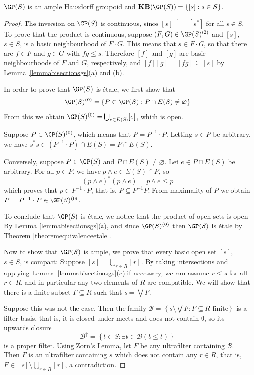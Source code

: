 \begin{proposition}[{\cite[Lemma 2.21(12)]{MR2827424}}]\label{propositionxisisanisomorphism}
$\GP(S)$ is an ample Hausdorff groupoid and $\mathbf{KB}(\GP(S))=\left\{[s]:s\in S\right\}$.
\end{proposition}
\begin{proof}
The inversion on $\GP(S)$ is continuous, since $[s]^{-1}=[s^*]$ for all $s\in S$. To prove that the product is continuous, suppose $(F,G)\in\GP(S)^{(2)}$ and $[s]$, $s\in S$, is a basic neighbourhood of $F\cdot G$. This means that $s\in F\cdot G$, so that there are $f\in F$ and $g\in G$ with $fg\leq s$. Therefore $[f]$ and $[g]$ are basic neighbourhoods of $F$ and $G$, respectively, and $[f][g]=[fg]\subseteq[s]$ by Lemma~\ref{lemmabisectionsgs}(a) and (b).

In order to prove that $\GP(S)$ is étale, we first show that
\[\GP(S)^{(0)}=\left\{P\in\GP(S):P\cap E(S)\neq\varnothing\right\}\]
From this we obtain $\GP(S)^{(0)}=\bigcup_{e\in E(S)}[e]$, which is open.

Suppose $P\in\GP(S)^{(0)}$, which means that $P=P^{-1}\cdot P$. Letting $s\in P$ be arbitrary, we have $s^*s\in(P^{-1}\cdot P)\cap E(S)=P\cap E(S)$.

Conversely, suppose $P\in\GP(S)$ and $P\cap E(S)\neq\varnothing$. Let $e\in P\cap E(S)$ be arbitrary. For all $p\in P$, we have $p\land e\in E(S)\cap P$, so
\[(p\land e)^*(p\land e)=p\land e\leq p\]
which proves that $p\in P^{-1}\cdot P$, that is, $P\subseteq P^{-1}P$. From maximality of $P$ we obtain $P=P^{-1}\cdot P\in\GP(S)^{(0)}$.

To conclude that $\GP(S)$ is étale, we notice that the product of open sets is open By Lemma \ref{lemmabisectionsgs}(a), and since $\GP(S)^{(0)}$ then $\GP(S)$ is étale by Theorem \ref{theoremequivalenceetale}.

Now to show that $\GP(S)$ is ample, we prove that every basic open set $[s]$, $s\in S$, is compact: Suppose $[s]=\bigcup_{r\in R}[r]$. By taking intersections and applying Lemma~\ref{lemmabisectionsgs}(c) if necessary, we can assume $r\leq s$ for all $r\in R$, and in particular any two elements of $R$ are compatible. We will show that there is a finite subset $F\subseteq R$ such that $s=\bigvee F$.

Suppose this was not the case. Then the family $\mathcal{B}=\left\{s\setminus\bigvee F:F\subseteq R\text{ finite}\right\}$ is a filter basis, that is, it is closed under meets and does not contain $0$, so its upwards closure
\[\mathcal{B}^\uparrow=\left\{t\in S:\exists b\in\mathcal{B}(b\leq t)\right\}\]
is a proper filter. Using Zorn's Lemma, let $F$ be any ultrafilter containing $\mathcal{B}$. Then $ F$ is an ultrafilter containing $s$ which does not contain any $r\in R$, that is, $ F\in[s]\setminus\bigcup_{r\in R}[r]$, a contradiction.


\end{proof}
